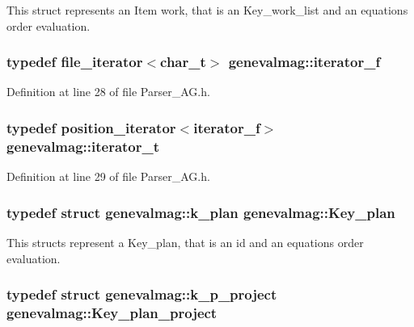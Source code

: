 This struct represents an Item work, that is an Key\_\-work\_\-list and an equations order evaluation. \hypertarget{namespacegenevalmag_068de0c39bd97e0f3fe3e3c805632e4b}{
\subsubsection[{iterator\_\-f}]{\setlength{\rightskip}{0pt plus 5cm}typedef file\_\-iterator$<${\bf char\_\-t}$>$ {\bf genevalmag::iterator\_\-f}}}
\label{namespacegenevalmag_068de0c39bd97e0f3fe3e3c805632e4b}




Definition at line 28 of file Parser\_\-AG.h.\hypertarget{namespacegenevalmag_64946721fb97e58be670a468bf8e7056}{
\subsubsection[{iterator\_\-t}]{\setlength{\rightskip}{0pt plus 5cm}typedef position\_\-iterator$<${\bf iterator\_\-f}$>$ {\bf genevalmag::iterator\_\-t}}}
\label{namespacegenevalmag_64946721fb97e58be670a468bf8e7056}




Definition at line 29 of file Parser\_\-AG.h.\hypertarget{namespacegenevalmag_9cb3d5a3c6e368bf7a12efbc09f71048}{
\subsubsection[{Key\_\-plan}]{\setlength{\rightskip}{0pt plus 5cm}typedef struct {\bf genevalmag::k\_\-plan}  {\bf genevalmag::Key\_\-plan}}}
\label{namespacegenevalmag_9cb3d5a3c6e368bf7a12efbc09f71048}


This structs represent a Key\_\-plan, that is an id and an equations order evaluation. \hypertarget{namespacegenevalmag_ce502fedfb5a14e31d5d20b0d35b807d}{
\subsubsection[{Key\_\-plan\_\-project}]{\setlength{\rightskip}{0pt plus 5cm}typedef struct {\bf genevalmag::k\_\-p\_\-project}  {\bf genevalmag::Key\_\-plan\_\-project}}}
\label{namespacegenevalmag_ce502fedfb5a14e31d5d20b0d35b807d}


